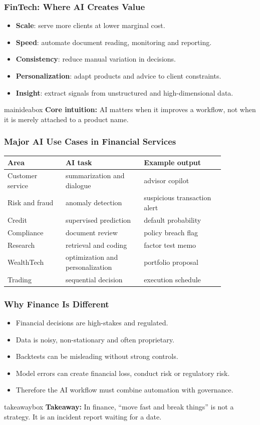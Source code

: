 \documentclass[aspectratio=169,12pt]{beamer}
\newcommand{\currentframetitle}{}
\newcommand{\slideTitle}[1]{\gdef\currentframetitle{#1}\frametitle{#1}}
\newcommand{\keyterm}[1]{\textbf{#1}}
\newcommand{\mainidea}[1]{%
  \vspace{0.08cm}
  \begin{beamercolorbox}[wd=\linewidth,rounded=true,sep=0.18cm]{mainideabox}
    \small\textbf{Core intuition:} #1
  \end{beamercolorbox}%
}
\newcommand{\takeaway}[1]{%
  \vspace{0.08cm}
  \begin{beamercolorbox}[wd=\linewidth,rounded=true,sep=0.18cm]{takeawaybox}
    \small\textbf{Takeaway:} #1
  \end{beamercolorbox}%
}
\begin{document}
\begin{frame}
\slideTitle{FinTech: Where AI Creates Value}
\begin{itemize}
  \item \keyterm{Scale}: serve more clients at lower marginal cost.
  \item \keyterm{Speed}: automate document reading, monitoring and reporting.
  \item \keyterm{Consistency}: reduce manual variation in decisions.
  \item \keyterm{Personalization}: adapt products and advice to client constraints.
  \item \keyterm{Insight}: extract signals from unstructured and high-dimensional data.
\end{itemize}
\mainidea{AI matters when it improves a workflow, not when it is merely attached to a product name.}
\end{frame}

\begin{frame}
\slideTitle{Major AI Use Cases in Financial Services}
\scriptsize
\begin{center}
\begin{tabular}{p{0.23\linewidth}p{0.31\linewidth}p{0.32\linewidth}}
\toprule
Area & AI task & Example output \\
\midrule
Customer service & summarization and dialogue & advisor copilot \\
Risk and fraud & anomaly detection & suspicious transaction alert \\
Credit & supervised prediction & default probability \\
Compliance & document review & policy breach flag \\
Research & retrieval and coding & factor test memo \\
WealthTech & optimization and personalization & portfolio proposal \\
Trading & sequential decision & execution schedule \\
\bottomrule
\end{tabular}
\end{center}
\end{frame}

\begin{frame}
\slideTitle{Why Finance Is Different}
\begin{itemize}
  \item Financial decisions are high-stakes and regulated.
  \item Data is noisy, non-stationary and often proprietary.
  \item Backtests can be misleading without strong controls.
  \item Model errors can create financial loss, conduct risk or regulatory risk.
  \item Therefore the AI workflow must combine automation with governance.
\end{itemize}
\takeaway{In finance, ``move fast and break things'' is not a strategy. It is an incident report waiting for a date.}
\end{frame}
\end{document}
